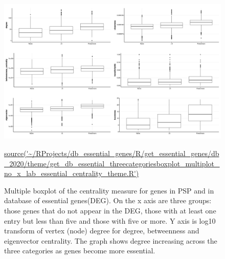 \begin{figure}
    \centering
    \includegraphics[width=\textwidth]{images/chapter3/ggplot2/db_essential_genes/theme/Rplot_multiplot_with_theme_simple.png}
    \caption{Multiple boxplot of the centrality measure for genes in PSP and in database of essential genes(DEG). On the x axis are three groups: those genes that do not appear in the DEG, those with at least one entry but less than five and those with five or more. Y axis is log10 transform of vertex (node) degree for degree, betweenness and eigenvector centrality. The graph shows degree increasing across the three categories as genes become more essential.} 
    \tiny\url{ source('~/RProjects/db_essential_genes/R/get_essential_genes/db_2020/theme/get_db_essential_threecategoriesboxplot_multiplot_no_x_lab_essential_centrality_theme.R')}
    \label{fig:boxplot_three_groups_DEG_multiplot1}
\end{figure}



